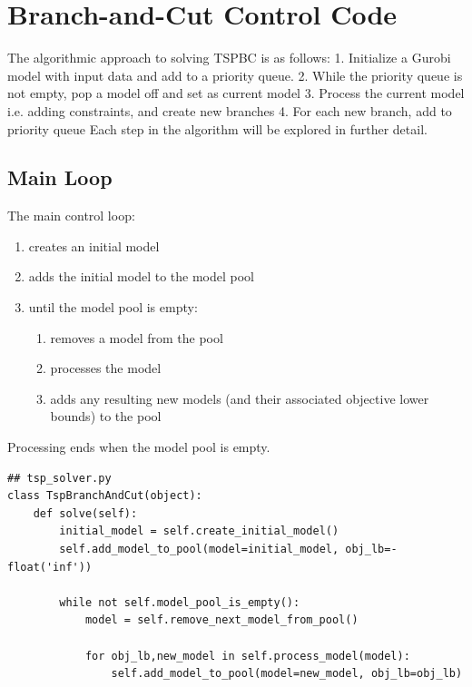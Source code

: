\documentclass{article}
\begin{document}
\section{Branch-and-Cut Control Code}

The algorithmic approach to solving TSPBC is as follows:
1. Initialize a Gurobi model with input data and add to a priority queue.
2. While the priority queue is not empty, pop a model off and set as current model
3. Process the current model i.e. adding constraints, and create new branches
4. For each new branch, add to priority queue
Each step in the algorithm will be explored in further detail.

\subsection{Main Loop}
\begin{flushleft}

The main control loop:

\begin{enumerate}
\item creates an initial model
\item adds the initial model to the model pool
\item until the model pool is empty:
  \begin{enumerate}
  \item removes a model from the pool
  \item processes the model
  \item adds any resulting new models (and their associated objective lower bounds) to the pool
  \end{enumerate}
\end{enumerate}

Processing ends when the model pool is empty.

\begin{lstlisting}
## tsp_solver.py
class TspBranchAndCut(object):
    def solve(self):
        initial_model = self.create_initial_model()
        self.add_model_to_pool(model=initial_model, obj_lb=-float('inf'))

        while not self.model_pool_is_empty():
            model = self.remove_next_model_from_pool()

            for obj_lb,new_model in self.process_model(model):
                self.add_model_to_pool(model=new_model, obj_lb=obj_lb)
\end{lstlisting}

\end{flushleft}
\end{document}
